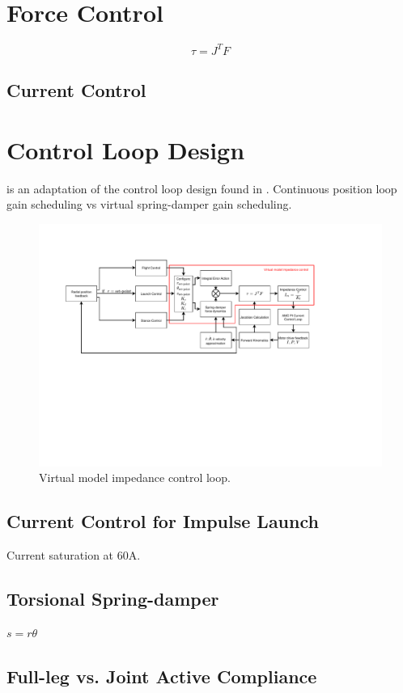 \section{Force Control}

\begin{equation}
\tau = J^TF
\end{equation}

\subsection{Current Control}


\section{Control Loop Design}
 is an adaptation of the control loop design found in \cite{Kalouche2016}. Continuous position loop gain scheduling vs virtual spring-damper gain scheduling.

\begin{figure}
\centering
\includegraphics[clip, trim=2cm 7cm 5cm 3cm, page = 1, width=1\textwidth]{images/control/virtual-model-impedance.pdf} 
\caption{Virtual model impedance control loop.}
\label{fig:virtual-model-impedance-loop}
\end{figure}

\subsection{Current Control for Impulse Launch}

Current saturation at 60A.

\subsection{Torsional Spring-damper}
$s = r \theta$\\

\subsection{Full-leg vs. Joint Active Compliance}